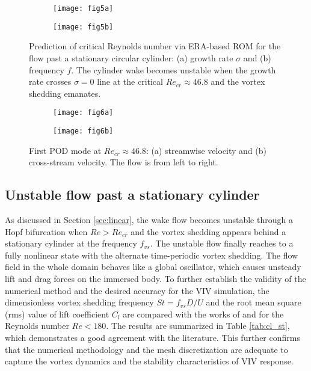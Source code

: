 \documentclass{jfm}
\begin{document}
\begin{figure}
\centering
\begin{subfigure}{0.495\textwidth}
  \texttt{[image: fig5a]}
    \caption{}
    \label{fig:growth}
    \end{subfigure} 
\begin{subfigure}{0.495\textwidth} 
\centering
  \texttt{[image: fig5b]}
	\caption{}
	\label{fig:freq}
	\end{subfigure}	
        \caption{Prediction of critical Reynolds number via ERA-based ROM for the 
                flow past a stationary circular cylinder: 
                (a) growth rate $\sigma$ and
                (b) frequency $f$.  The cylinder wake becomes unstable when 
                the growth rate crosses $\sigma=0$ line at the critical 
                $Re_{cr} \approx 46.8$ and the vortex shedding emanates.  }
        \label{fig:growth_f}
\end{figure}



\begin{figure}
\centering
\begin{subfigure}{0.495\textwidth}
	 \texttt{[image: fig6a]}
    \caption{}
    \label{fig:mode1_ux}
    \end{subfigure} 
\begin{subfigure}{0.495\textwidth} 
\centering
     \texttt{[image: fig6b]}
	\caption{}
	\label{fig:mode1_uy}
	\end{subfigure}	
     \caption{First POD mode at 
     $Re_{cr} \approx 46.8$: (a) streamwise velocity and 
     (b) cross-stream velocity.
      The flow is from left to right. }
\label{fig:cylinder_mode}
\end{figure}


\subsection{Unstable flow past a stationary cylinder}
As discussed in Section \ref{sec:linear}, the wake flow becomes unstable 
through a Hopf bifurcation when $Re > Re_{cr}$ 
and  the vortex shedding appears behind a stationary cylinder 
at the frequency $f_{vs}$. 
The unstable flow finally reaches to a fully nonlinear state 
with the alternate time-periodic vortex shedding. 
%
The flow field in the whole domain behaves like a global oscillator, which 
causes unsteady lift and drag forces on the immersed body.
%
To further establish the validity of the numerical method 
and the desired accuracy for the VIV simulation, 
the dimensionless vortex shedding frequency $St= f_{vs}D/U$ and the root mean square (rms) value of  lift coefficient $C_l$ 
are compared with the works of \cite{williamson1989} and \cite{Zhang1995} 
for the Reynolds number $Re < 180$. 
The results are summarized in Table \ref{tab:cl_st}, which demonstrates a good agreement 
with the literature. This further confirms that 
the numerical methodology and the mesh discretization are adequate to 
capture the vortex dynamics and the stability characteristics of VIV response.  
\end{document}
